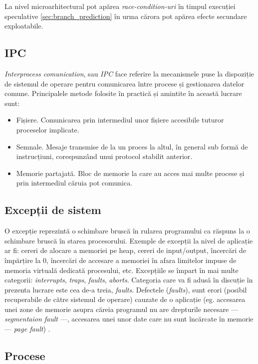 La nivel microarhitectural pot apărea \emph{race-condition-uri} în timpul
execuției speculative \ref{sec:branch_prediction} în urma cărora pot apărea
efecte secundare exploatabile.

\subsection{IPC}

\emph{Interprocess comunication}, sau \emph{IPC} face referire la mecanismele
puse la dispoziție de sistemul de operare pentru comunicarea între procese și
gestionarea datelor comune. Principalele metode folosite în practică și amintite în
această lucrare sunt:
\begin{itemize}
  \setlength\itemsep{0em}
  \item Fișiere. Comunicarea prin intermediul unor fișiere accesibile tuturor
    proceselor implicate.
  \item Semnale. Mesaje transmise de la un proces la altul, în general sub
    formă de instrucțiuni, corespunzând unui protocol stabilit anterior.
  \item Memorie partajată. Bloc de memorie la care au acces mai multe procese
    și prin intermediul căruia pot comunica.
\end{itemize}

\subsection{Excepții de sistem}

O excepție reprezintă o schimbare bruscă în rularea programului ca răspuns la o
schimbare bruscă în starea procesorului. Exemple de excepții la nivel de
aplicație ar fi: cereri de alocare a memoriei pe heap, cereri de input/output,
încercări de împărțire la $0$, încercări de accesare a memoriei în afara
limitelor impuse de memoria virtuală dedicată procesului, etc. Excepțiile se
împart în mai multe categorii: \emph{interrupts}, \emph{traps}, \emph{faults},
\emph{aborts}. Categoria care va fi adusă în discuție în prezenta lucrare este
cea de-a treia, \emph{faults}. Defectele (\emph{faults}), sunt erori (posibil
recuperabile de către sistemul de operare) cauzate de o aplicație (eg.
accesarea unei zone de memorie asupra căreia programul nu are drepturile
necesare --- \emph{segmentaion fault} ---, accesarea unei unor date care nu
sunt încărcate în memorie --- \emph{page fault}) \cite{exception_processes}.

\subsection{Procese}

